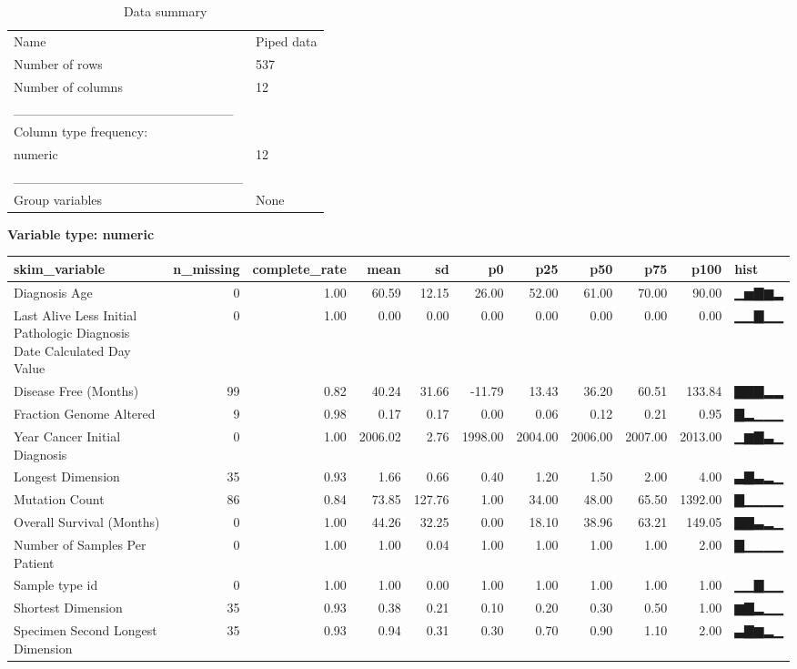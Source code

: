 \documentclass[]{article}
\newenvironment{Shaded}{\begin{snugshade}}{\end{snugshade}}
\newcommand{\KeywordTok}[1]{\textcolor[rgb]{0.13,0.29,0.53}{\textbf{#1}}}
\newcommand{\StringTok}[1]{\textcolor[rgb]{0.31,0.60,0.02}{#1}}
\newcommand{\OperatorTok}[1]{\textcolor[rgb]{0.81,0.36,0.00}{\textbf{#1}}}
\newcommand{\NormalTok}[1]{#1}
\begin{document}
\begin{longtable}[]{@{}ll@{}}
\caption{Data summary}\tabularnewline
\toprule
Name & Piped data\tabularnewline
Number of rows & 537\tabularnewline
Number of columns & 12\tabularnewline
\_\_\_\_\_\_\_\_\_\_\_\_\_\_\_\_\_\_\_\_\_\_\_ &\tabularnewline
Column type frequency: &\tabularnewline
numeric & 12\tabularnewline
\_\_\_\_\_\_\_\_\_\_\_\_\_\_\_\_\_\_\_\_\_\_\_\_ &\tabularnewline
Group variables & None\tabularnewline
\bottomrule
\end{longtable}

\textbf{Variable type: numeric}

\begin{longtable}[]{@{}lrrrrrrrrrl@{}}
\toprule
skim\_variable & n\_missing & complete\_rate & mean & sd & p0 & p25 &
p50 & p75 & p100 & hist\tabularnewline
\midrule
\endhead
Diagnosis Age & 0 & 1.00 & 60.59 & 12.15 & 26.00 & 52.00 & 61.00 & 70.00
& 90.00 & ▁▅▇▆▂\tabularnewline
Last Alive Less Initial Pathologic Diagnosis Date Calculated Day Value &
0 & 1.00 & 0.00 & 0.00 & 0.00 & 0.00 & 0.00 & 0.00 & 0.00 &
▁▁▇▁▁\tabularnewline
Disease Free (Months) & 99 & 0.82 & 40.24 & 31.66 & -11.79 & 13.43 &
36.20 & 60.51 & 133.84 & ▇▇▇▂▂\tabularnewline
Fraction Genome Altered & 9 & 0.98 & 0.17 & 0.17 & 0.00 & 0.06 & 0.12 &
0.21 & 0.95 & ▇▂▁▁▁\tabularnewline
Year Cancer Initial Diagnosis & 0 & 1.00 & 2006.02 & 2.76 & 1998.00 &
2004.00 & 2006.00 & 2007.00 & 2013.00 & ▁▆▇▃▁\tabularnewline
Longest Dimension & 35 & 0.93 & 1.66 & 0.66 & 0.40 & 1.20 & 1.50 & 2.00
& 4.00 & ▃▇▃▂▁\tabularnewline
Mutation Count & 86 & 0.84 & 73.85 & 127.76 & 1.00 & 34.00 & 48.00 &
65.50 & 1392.00 & ▇▁▁▁▁\tabularnewline
Overall Survival (Months) & 0 & 1.00 & 44.26 & 32.25 & 0.00 & 18.10 &
38.96 & 63.21 & 149.05 & ▇▇▃▂▁\tabularnewline
Number of Samples Per Patient & 0 & 1.00 & 1.00 & 0.04 & 1.00 & 1.00 &
1.00 & 1.00 & 2.00 & ▇▁▁▁▁\tabularnewline
Sample type id & 0 & 1.00 & 1.00 & 0.00 & 1.00 & 1.00 & 1.00 & 1.00 &
1.00 & ▁▁▇▁▁\tabularnewline
Shortest Dimension & 35 & 0.93 & 0.38 & 0.21 & 0.10 & 0.20 & 0.30 & 0.50
& 1.00 & ▆▇▂▁▁\tabularnewline
Specimen Second Longest Dimension & 35 & 0.93 & 0.94 & 0.31 & 0.30 &
0.70 & 0.90 & 1.10 & 2.00 & ▃▇▆▂▁\tabularnewline
\bottomrule
\end{longtable}

\begin{Shaded}
\end{Shaded}
\end{document}

